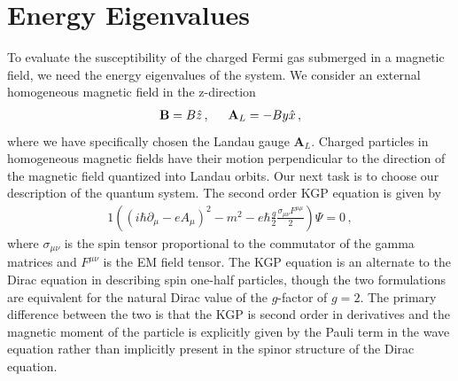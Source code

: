 \documentclass[
aps,
pra,
showpacs,
preprintnumbers,
amsmath,
amssymb,
footinbib
]{revtex4-2}
\begin{document}
\section{Energy Eigenvalues}\label{sec:Energy}
\noindent To evaluate the susceptibility of the charged Fermi gas submerged in a magnetic field, we need the energy eigenvalues of the system. We consider an external homogeneous magnetic field in the z-direction
\begin{alignat}{1}
  \label{LANeq01} \textbf{B}=B\hat{z}\,,\indent \textbf{A}_{L}=-By\hat{x}\,,
\end{alignat}
where we have specifically chosen the Landau gauge $\textbf{A}_{L}$. Charged particles in homogeneous magnetic fields have their motion perpendicular to the direction of the magnetic field quantized into Landau orbits. Our next task is to choose our description of the quantum system. The second order KGP equation is given by
\begin{alignat}{1}
  \label{LANeq02} \left(\left(i\hbar\partial_{\mu}-eA_{\mu}\right)^{2}-m^{2}-e\hbar\frac{g}{2}\frac{\sigma_{\mu\nu}F^{\mu\mu}}{2}\right)\Psi=0\,,
\end{alignat}
where $\sigma_{\mu\nu}$ is the spin tensor proportional to the commutator of the gamma matrices and $F^{\mu\nu}$ is the EM field tensor. The KGP equation is an alternate to the Dirac equation in describing spin one-half particles, though the two formulations are equivalent for the natural Dirac value of the $g$-factor of $g=2$. The primary difference between the two is that the KGP is second order in derivatives and the magnetic moment of the particle is explicitly given by the Pauli term in the wave equation rather than implicitly present in the spinor structure of the Dirac equation.
\end{document}
